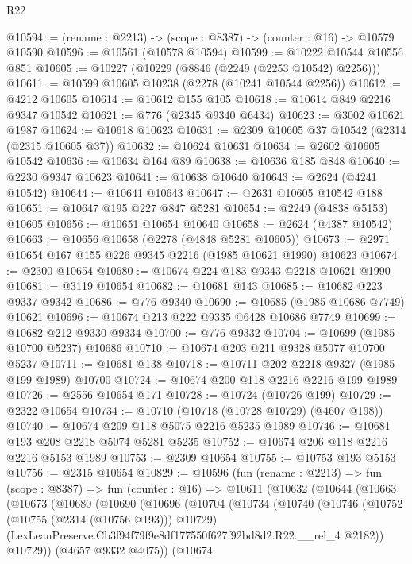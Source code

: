 \begin{lexlean}{R22}
\begin{coremodule}
@10594 := (rename : @2213) -> (scope : @8387) -> (counter : @16) -> @10579 @10590
@10596 := @10561 (@10578 @10594)
@10599 := @10222 @10544 @10556 @851
@10605 := @10227 (@10229 (@8846 (@2249 (@2253 @10542) @2256)))
@10611 := @10599 @10605 @10238 (@2278 (@10241 @10544 @2256))
@10612 := @4212 @10605
@10614 := @10612 @155 @105
@10618 := @10614 @849 @2216 @9347 @10542
@10621 := @776 (@2345 @9340 @6434)
@10623 := @3002 @10621 @1987
@10624 := @10618 @10623
@10631 := @2309 @10605 @37 @10542 (@2314 (@2315 @10605 @37))
@10632 := @10624 @10631
@10634 := @2602 @10605 @10542
@10636 := @10634 @164 @89
@10638 := @10636 @185 @848
@10640 := @2230 @9347 @10623
@10641 := @10638 @10640
@10643 := @2624 (@4241 @10542)
@10644 := @10641 @10643
@10647 := @2631 @10605 @10542 @188
@10651 := @10647 @195 @227 @847 @5281
@10654 := @2249 (@4838 @5153) @10605
@10656 := @10651 @10654 @10640
@10658 := @2624 (@4387 @10542)
@10663 := @10656 @10658 (@2278 (@4848 @5281 @10605))
@10673 := @2971 @10654 @167 @155 @226 @9345 @2216 (@1985 @10621 @1990) @10623
@10674 := @2300 @10654
@10680 := @10674 @224 @183 @9343 @2218 @10621 @1990
@10681 := @3119 @10654
@10682 := @10681 @143
@10685 := @10682 @223 @9337 @9342
@10686 := @776 @9340
@10690 := @10685 (@1985 @10686 @7749) @10621
@10696 := @10674 @213 @222 @9335 @6428 @10686 @7749
@10699 := @10682 @212 @9330 @9334
@10700 := @776 @9332
@10704 := @10699 (@1985 @10700 @5237) @10686
@10710 := @10674 @203 @211 @9328 @5077 @10700 @5237
@10711 := @10681 @138
@10718 := @10711 @202 @2218 @9327 (@1985 @199 @1989) @10700
@10724 := @10674 @200 @118 @2216 @2216 @199 @1989
@10726 := @2556 @10654 @171
@10728 := @10724 (@10726 @199)
@10729 := @2322 @10654
@10734 := @10710 (@10718 (@10728 @10729) (@4607 @198))
@10740 := @10674 @209 @118 @5075 @2216 @5235 @1989
@10746 := @10681 @193 @208 @2218 @5074 @5281 @5235
@10752 := @10674 @206 @118 @2216 @2216 @5153 @1989
@10753 := @2309 @10654
@10755 := @10753 @193 @5153
@10756 := @2315 @10654
@10829 := @10596
    (fun (rename : @2213) =>
    fun (scope : @8387) =>
    fun (counter : @16) =>
    @10611
      (@10632
        (@10644
          (@10663
            (@10673
              (@10680
                (@10690
                  (@10696
                    (@10704
                      (@10734
                        (@10740
                          (@10746
                            (@10752 (@10755 (@2314 (@10756 @193))) @10729)
                            (LexLeanPreserve.Cb3f94f79f9e8df177550f627f92bd8d2.R22.__rel_4 @2182))
                          @10729))
                      (@4657 @9332 @4075))
                    (@10674

\end{coremodule}
\end{lexlean}
